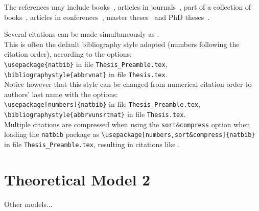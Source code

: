 The references may include books~\cite{Marta:AeroBest2021}, articles in journals~\cite{Morgado:2022:SAMO}, part of a collection of books~\cite{jameson:adjointns}, articles in conferences~\cite{Alves:ICUAS:2022}, master theses~\cite{Pacheco:MSc} and PhD theses~\cite{Rodrigues:PhD}.

Several citations can be made simultaneously as \cite{Campos:2021:QJMAM,Alexandre:2020:PLOS}. \\

This is often the default bibliography style adopted (numbers following the citation order), according to the options:\\
{\tt \textbackslash usepackage\{natbib\}} in file {\tt Thesis\_Preamble.tex},\\
{\tt \textbackslash bibliographystyle\{abbrvnat\}} in file {\tt Thesis.tex}.\\

Notice however that this style can be changed from numerical citation order to authors' last name with the options: \\
{\tt \textbackslash usepackage[numbers]\{natbib\}} in file {\tt Thesis\_Preamble.tex},\\
{\tt \textbackslash bibliographystyle\{abbrvunsrtnat\}} in file {\tt Thesis.tex}. \\

Multiple citations are compressed when using the {\tt sort\&compress} option when loading the {\tt natbib} package as {\tt \textbackslash usepackage[numbers,sort\&compress]\{natbib\}} in file {\tt Thesis\_Preamble.tex}, resulting in citations like \cite{Rodrigues:2020:SAMO,Rodrigues:2019:RENE,Campos:2018:JSV,Rodrigues:2018:CAF,Campos:2015:GAFD,Marta:2014:JPP,Rodrigues:2014:SMO,Campos:2014:IJMS,Marta:2013:AIAAJ,Marta:2013:CAF,Marta:2010:CAF,Marta:2007:IJCFD}.


\section{Theoretical Model 2}
\label{section:theory2}

Other models...

